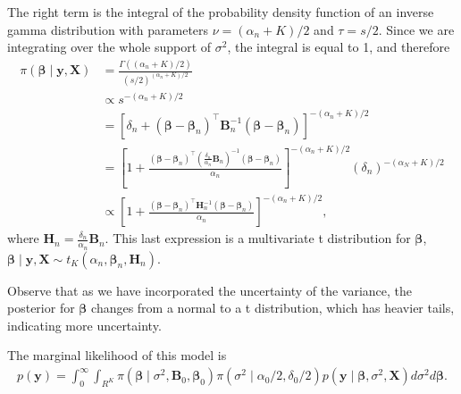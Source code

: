 The right term is the integral of the probability density function of an inverse gamma distribution with parameters $\nu = (\alpha_n+K)/2$ and $\tau = s/2$. Since we are integrating over the whole support of $\sigma^2$, the integral is equal to 1, and therefore
\begin{align*}
	\pi(\bm{\beta}\mid {\bm{y}},{\bm{X}}) & = \frac{\Gamma((\alpha_n+K)/2)}{(s/2)^{(\alpha_n+K)/2}} \\
	& \propto s^{-(\alpha_n+K)/2} \\
	& = [\delta_n + (\bm{\beta} - \bm{\beta}_n)^{\top}{{\bm{B}}}_n^{-1}(\bm{\beta} - \bm{\beta}_n)]^{-(\alpha_n+K)/2} \\
	& = \left[1 + \frac{(\bm{\beta} - \bm{\beta}_n)^{\top}\left(\frac{\delta_n}{\alpha_n}{{\bm{B}}}_n\right)^{-1}(\bm{\beta} - \bm{\beta}_n)}{\alpha_n}\right]^{-(\alpha_n+K)/2}(\delta_n)^{-(\alpha_N+K)/2} \\
	& \propto \left[1 + \frac{(\bm{\beta} - \bm{\beta}_n)^{\top}{\bm{H}}_n^{-1}(\bm{\beta} - \bm{\beta}_n)}{\alpha_n}\right]^{-(\alpha_n+K)/2},
\end{align*}
where ${\bm{H}}_n = \frac{\delta_n}{\alpha_n}{\bm{B}}_n$. This last expression is a multivariate t distribution for $\bm{\beta}$, $\bm{\beta}\mid {\bm{y}},{\bm{X}} \sim t_K(\alpha_n, \bm{\beta}_n, {\bm{H}}_n)$.

Observe that as we have incorporated the uncertainty of the variance, the posterior for $\bm{\beta}$ changes from a normal to a t distribution, which has heavier tails, indicating more uncertainty. 

The marginal likelihood of this model is
\begin{align*}
	p({\bm{y}})=\int_0^{\infty}\int_{R^K}\pi (\bm{\beta} \mid  \sigma^2,{\bm{B}}_0,\bm{\beta}_0 )\pi(\sigma^2\mid  \alpha_0/2, \delta_0/2)p({\bm{y}}\mid \bm{\beta}, \sigma^2, {\bm{X}})d\sigma^2 d\bm{\beta}.
\end{align*}

